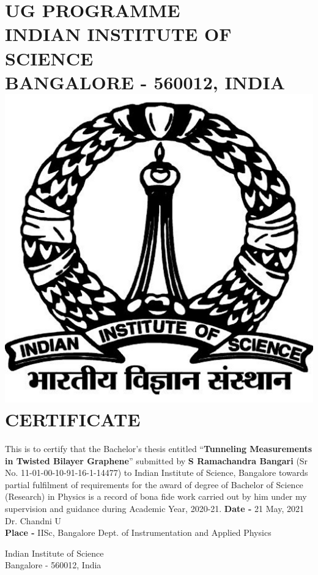 \cleardoublepage
\section*{\centering 
UG PROGRAMME \\
INDIAN INSTITUTE OF SCIENCE \\ 
BANGALORE - 560012, INDIA \\ \vspace{1 cm}
\centering \includegraphics[scale=0.2]{Logo.png} \\
\vspace{1 cm}
\centering CERTIFICATE
}
\vspace{2 cm}
This is to certify that the Bachelor's thesis entitled “\textbf{Tunneling Measurements in Twisted Bilayer Graphene}” submitted by \textbf{S Ramachandra Bangari} (Sr No. 11-01-00-10-91-16-1-14477) to Indian Institute of Science, Bangalore towards partial fulfilment of requirements for the award of degree of Bachelor of Science (Research) in Physics is a record of bona fide work carried out by him under my supervision and guidance during Academic Year, 2020-21.
\vfill
\textbf{Date -} 21 May, 2021 \hfill Dr. Chandni U \\
\textbf{Place -} IISc, Bangalore \hfill  Dept. of Instrumentation and Applied Physics \begin{flushright}
Indian Institute of Science\\
Bangalore - 560012, India
\end{flushright} 
